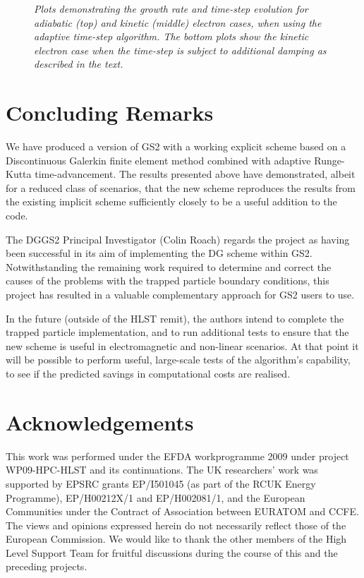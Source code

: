 \documentclass[10pt,a4paper]{article}
\begin{document}
\begin{figure}[!p]
  \begin{center}
  \end{center}
  \caption{\textit{Plots demonstrating the growth rate and time-step evolution for
    adiabatic (top) and kinetic (middle) electron cases, when using the adaptive
    time-step algorithm. The bottom plots show the kinetic electron case when
    the time-step is subject to additional damping as described in the text.}
  \label{fig:adaptivedt2} }
\end{figure}


\section{Concluding Remarks}

We have produced a version of GS2 with a working explicit scheme based on a
Discontinuous Galerkin finite element method combined with adaptive
Runge-Kutta time-advancement. The results presented above have demonstrated,
albeit for a reduced class of scenarios, that the new scheme reproduces the
results from the existing implicit scheme sufficiently closely to be a useful
addition to the code.

The DGGS2 Principal Investigator (Colin Roach) regards the project as having
been successful in its aim of implementing the DG scheme within GS2.
Notwithstanding the remaining work required to determine and correct the
causes of the problems with the trapped particle boundary conditions, this
project has resulted in a valuable complementary approach for GS2 users to
use.

In the future (outside of the HLST remit), the authors intend to complete the
trapped particle implementation, and to run additional tests to ensure that
the new scheme is useful in electromagnetic and non-linear scenarios. At that
point it will be possible to perform useful, large-scale tests of the
algorithm's capability, to see if the predicted savings in computational costs
are realised.

\section*{Acknowledgements}

This work was performed under the EFDA workprogramme 2009 under project
WP09-HPC-HLST and its continuations. The UK researchers' work was supported by
EPSRC grants EP/I501045 (as part of the RCUK Energy Programme), EP/H00212X/1
and EP/H002081/1, and the European Communities under the Contract of
Association between EURATOM and CCFE\@. The views and opinions expressed
herein do not necessarily reflect those of the European Commission. We would
like to thank the other members of the High Level Support Team for fruitful
discussions during the course of this and the preceding projects.
\end{document}
